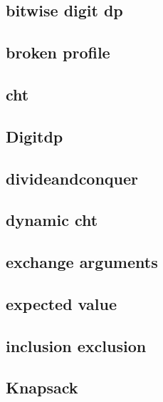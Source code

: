 \subsection{bitwise digit dp}
\raggedbottom
\hrulefill
\subsection{broken profile}
\raggedbottom
\hrulefill
\subsection{cht}
\raggedbottom
\hrulefill
\subsection{Digitdp}
\raggedbottom
\hrulefill
\subsection{divideandconquer}
\raggedbottom
\hrulefill
\subsection{dynamic cht}
\raggedbottom
\hrulefill
\subsection{exchange arguments}
\raggedbottom
\hrulefill
\subsection{expected value}
\raggedbottom
\hrulefill
\subsection{inclusion exclusion}
\raggedbottom
\hrulefill
\subsection{Knapsack}
\raggedbottom
\hrulefill
